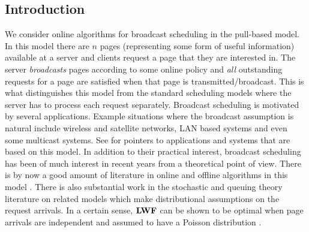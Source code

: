 \documentclass[11pt]{article}
\begin{document}
\begin{titlepage}
\section{Introduction}
We consider online algorithms for broadcast scheduling in the
pull-based model. In this model there are $n$ pages (representing some
form of useful information) available at a server and clients request
a page that they are interested in. The server {\em broadcasts} pages
according to some online policy and {\em all} outstanding requests for
a page are satisfied when that page is transmitted/broadcast. This is
what distinguishes this model from the standard scheduling models
where the server has to process each request separately. Broadcast
scheduling is motivated by several applications. Example situations
where the broadcast assumption is natural include wireless and
satellite networks, LAN based systems and even some multicast
systems. See \cite{Wong88,AcharyaFZ95,AksoyF98,Hall03} for pointers to
applications and systems that are based on this model. In addition to
their practical interest, broadcast scheduling has been of much
interest in recent years from a theoretical point of view. There is by
now a good amount of literature in online and offline algorithms in
this model \cite{BarnoyBNS98,AksoyF98,AcharyaFZ95,BartalM00,Hall03}. There is
also substantial work in the stochastic and queuing theory literature
\cite{DebS73,Deb84,Weiss79,WeissP81} on related models which make
distributional assumptions on the request arrivals. In a certain
sense, ${\texttt{\bf{LWF}}}$ can be shown to be optimal when page arrivals are
independent and assumed to have a Poisson distribution
\cite{AmmarW85}.




\end{titlepage}
\end{document}
